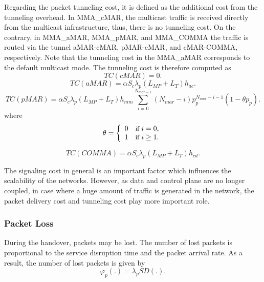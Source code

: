 Regarding the packet tunneling cost, it is defined as the additional cost from the tunneling overhead. In MMA\_cMAR, the multicast traffic is received directly from the multicast infrastructure, thus, there is no tunneling cost. On the contrary, in MMA\_aMAR, MMA\_pMAR, and MMA\_COMMA the traffic is routed via the tunnel aMAR-cMAR, pMAR-cMAR, and cMAR-COMMA, respectively. Note that the tunneling cost in the MMA\_aMAR corresponds to the default multicast mode. The tunneling cost is therefore computed as\\ 
\begin{equation}
TC(cMAR) = 0. 
\end{equation}
\begin{equation}
TC(aMAR) = \alpha  S_{c} \lambda_{p} (L_{MP} + L_{T}) h_{ac}. 
\end{equation}
\begin{equation}
TC(pMAR)=  \alpha  S_{c} \lambda_{p} (L_{MP} + L_{T}) h_{mm}  \sum_{i=0}^{N_{mar-1}} (N_{mar}-i)p_{p}^{N_{mar}-i-1} (1-\theta p_{p}).
\end{equation}
where 
\[\theta  = \left\{ 
 \begin{array}{l l}
   0 \quad \small \text{if } i =0,  \\
    1  \quad \small \text{if } i \geq 1. 
 \end{array} \right.\] 

\begin{equation}
TC(COMMA) = \alpha  S_{c} \lambda_{p} (L_{MP} + L_{T}) h_{cd}. 
\end{equation}

The signaling cost in general is an important factor which influences the scalability of the networks. However, as data and control plane are no longer coupled, in case where a huge amount of traffic is generated in the network, the packet delivery cost and tunneling cost play more important role.  
 
\subsubsection{Packet Loss}
During the handover, packets may be lost. The number of lost packets is proportional to the service disruption time and the packet arrival rate. As a result, the number of lost packets is given by\\
\begin{equation}
\varphi_{p}(.)= \lambda_{p} SD(.).
\end{equation}

\normalsize
